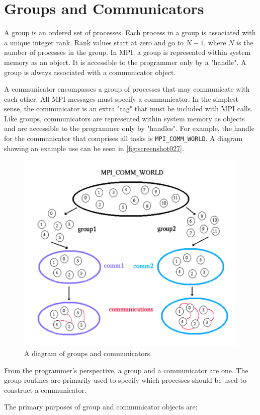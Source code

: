 \section{Groups and Communicators}
A group is an ordered set of processes. Each process in a group is associated with a unique integer rank. Rank values start at zero and go to $N-1$, where $N$ is the number of processes in the group. In MPI, a group is represented within system memory as an object. It is accessible to the programmer only by a "handle". A group is always associated with a communicator object.  

A communicator encompasses a group of processes that may communicate with each other. All MPI messages must specify a communicator. In the simplest sense, the communicator is an  extra  "tag"  that  must  be  included  with  MPI  calls.  Like  groups,  communicators  are represented within system memory as objects and are accessible to the programmer only by "handles".  For  example,  the  handle  for  the  communicator  that  comprises  all  tasks  is \texttt{MPI\_COMM\_WORLD}.  A diagram showing an example use can be seen in \autoref{fig:screenshot027}.

\begin{figure}
\centering
\includegraphics[width=0.7\linewidth]{screenshot027}
\caption{A diagram of groups and communicators.}
\label{fig:screenshot027}
\end{figure}

From  the  programmer's  perspective,  a  group  and  a  communicator  are  one.  The  group routines  are  primarily  used  to  specify  which  processes  should  be  used  to  construct  a communicator.  

The primary purposes of group and communicator objects are:


